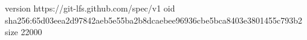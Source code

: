 version https://git-lfs.github.com/spec/v1
oid sha256:65d03eea2d97842aeb5e55ba2b8dcaebee96936cbe5bca8403e3801455c793b2
size 22000
